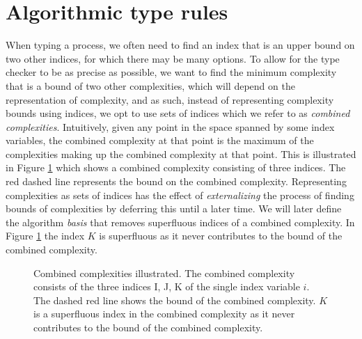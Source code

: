\section{Algorithmic type rules}\label{section:typeruless}
%
%

When typing a process, we often need to find an index that is an upper bound on two other indices, for which there may be many options. To allow for the type checker to be as precise as possible, we want to find the minimum complexity that is a bound of two other complexities, which will depend on the representation of complexity, and as such, instead of representing complexity bounds using indices, we opt to use sets of indices which we refer to as \textit{combined complexities}. Intuitively, given any point in the space spanned by some index variables, the combined complexity at that point is the maximum of the complexities making up the combined complexity at that point. This is illustrated in Figure \ref{fig:combined_complexity} which shows a combined complexity consisting of three indices. The red dashed line represents the bound on the combined complexity. Representing complexities as sets of indices has the effect of \textit{externalizing} the process of finding bounds of complexities by deferring this until a later time. We will later define the algorithm \textit{basis} that removes superfluous indices of a combined complexity. In Figure \ref{fig:combined_complexity} the index $K$ is superfluous as it never contributes to the bound of the combined complexity.

\begin{figure}
    \centering
    
    \caption{Combined complexities illustrated. The combined complexity consists of the three indices I, J, K of the single index variable $i$. The dashed red line shows the bound of the combined complexity. $K$ is a superfluous index in the combined complexity as it never contributes to the bound of the combined complexity.}
    \label{fig:combined_complexity}
\end{figure}



